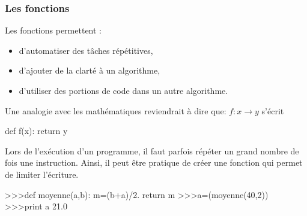 \begin{frame}[fragile]
\frametitle{Les fonctions}

\begin{minipage}{0.55\linewidth}
\begin{defi}
Les fonctions permettent :
\begin{itemize}
 \item d'automatiser des tâches répétitives,
 \item d'ajouter de la clarté à un algorithme,
 \item d'utiliser des portions de code dans un autre algorithme.
\end{itemize}
\end{defi}
\end{minipage}\hfill
\begin{minipage}{0.35\linewidth}
Une analogie avec les mathématiques reviendrait à dire que: 
$f:x\rightarrow y$ s'écrit \\
\begin{GrayBox}[0.75\textwidth]
\begin{verbatimtab}[3]
def f(x):
    return y
\end{verbatimtab}
\end{GrayBox}
\end{minipage}

Lors de l'exécution d'un programme, il faut parfois répéter un grand nombre de fois une instruction. Ainsi, il peut être pratique de créer une fonction qui permet de limiter l'écriture.

\vspace{-0.1cm}

\begin{GrayBox}[0.75\textwidth]
\begin{verbatimtab}[3]
>>>def moyenne(a,b):
    m=(b+a)/2.
    return m
>>>a=(moyenne(40,2))
>>>print a
	21.0
\end{verbatimtab}
\end{GrayBox}
\end{frame}

